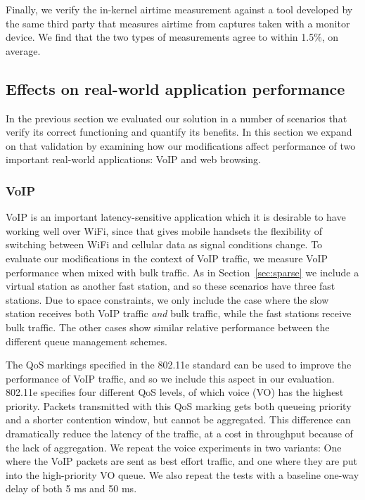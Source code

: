 \documentclass[english]{scrartcl}
\begin{document}
Finally, we verify the in-kernel airtime measurement against a tool developed by
the same third party that measures airtime from captures taken with a monitor
device. We find that the two types of measurements agree to within 1.5\%, on
average.


\subsection{Effects on real-world application performance}
\label{sec:orgdd1e253}
In the previous section we evaluated our solution in a number of scenarios
that verify its correct functioning and quantify its benefits. In this section
we expand on that validation by examining how our modifications affect
performance of two important real-world applications: VoIP and web browsing.

\subsubsection{VoIP}
\label{sec:orgfc42688}
VoIP is an important latency-sensitive application which it is desirable to have
working well over WiFi, since that gives mobile handsets the flexibility of
switching between WiFi and cellular data as signal conditions change. To
evaluate our modifications in the context of VoIP traffic, we measure VoIP
performance when mixed with bulk traffic. As in Section \ref{sec:sparse} we
include a virtual station as another fast station, and so these scenarios have
three fast stations. Due to space constraints, we only include the case where
the slow station receives both VoIP traffic \emph{and} bulk traffic, while the fast
stations receive bulk traffic. The other cases show similar relative performance
between the different queue management schemes.

The QoS markings specified in the 802.11e standard can be used to improve the
performance of VoIP traffic, and so we include this aspect in our evaluation.
802.11e specifies four different QoS levels, of which voice (VO) has the highest
priority. Packets transmitted with this QoS marking gets both queueing priority
and a shorter contention window, but cannot be aggregated. This difference can
dramatically reduce the latency of the traffic, at a cost in throughput because
of the lack of aggregation. We repeat the voice experiments in two variants: One
where the VoIP packets are sent as best effort traffic, and one where they are
put into the high-priority VO queue. We also repeat the tests with a baseline
one-way delay of both 5 ms and 50 ms.
\end{document}
